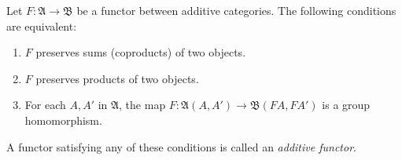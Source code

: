 Let $F : \mathfrak{A} \to \mathfrak{B}$ be a functor between additive categories. The following conditions are equivalent:
\begin{enumerate}
\item[(i)] $F$ preserves sums (coproducts) of two objects.
\item[(ii)] $F$ preserves products of two objects.
\item[(iii)] For each $A, A'$ in $\mathfrak{A}$, the map $F : \mathfrak{A}(A, A') \to \mathfrak{B}(FA, FA')$ is a group homomorphism.
\end{enumerate}
A functor satisfying any of these conditions is called an \textit{additive functor}.
